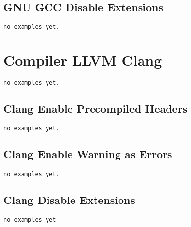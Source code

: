 \subsection{GNU GCC Disable Extensions}

\begin{verbatim}
no examples yet.
\end{verbatim}

\section{Compiler LLVM Clang}

\begin{verbatim}
no examples yet.
\end{verbatim}

\subsection{Clang Enable Precompiled Headers}

\begin{verbatim}
no examples yet.
\end{verbatim}

\subsection{Clang Enable Warning as Errors}

\begin{verbatim}
no examples yet.
\end{verbatim}

\subsection{Clang Disable Extensions}

\begin{verbatim}
no examples yet
\end{verbatim}

